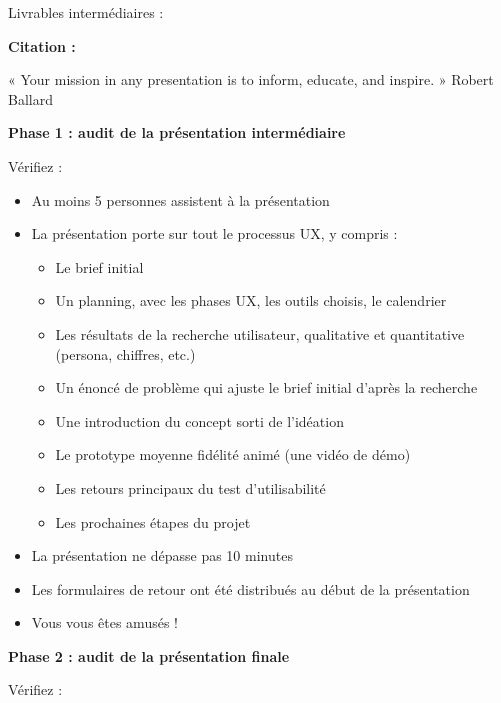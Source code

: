 Livrables intermédiaires :

\textbf{Citation :}

« Your mission in any presentation is to inform, educate, and inspire. » Robert Ballard

\medskip

\textbf{Phase 1 : audit de la présentation intermédiaire}

Vérifiez :

\begin{itemize}
\item Au moins 5 personnes assistent à la présentation
\item La présentation porte sur tout le processus UX, y compris :
\begin{itemize}
\item Le brief initial
\item Un planning, avec les phases UX, les outils choisis, le calendrier
\item Les résultats de la recherche utilisateur, qualitative et quantitative (persona, chiffres, etc.)
\item Un énoncé de problème qui ajuste le brief initial d'après la recherche
\item Une introduction du concept sorti de l'idéation
\item Le prototype moyenne fidélité animé (une vidéo de démo)
\item Les retours principaux du test d'utilisabilité
\item Les prochaines étapes du projet
\end{itemize}
\item La présentation ne dépasse pas 10 minutes
\item Les formulaires de retour ont été distribués au début de la présentation
\item Vous vous êtes amusés !
\end{itemize}

\medskip

\textbf{Phase 2 : audit de la présentation finale}

Vérifiez :

